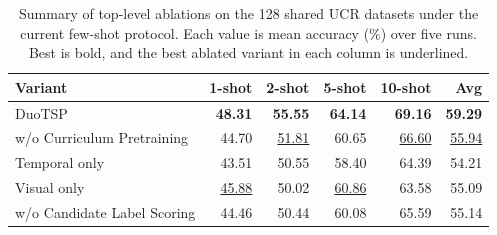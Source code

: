 \begin{table}[t]
\centering
\caption{Summary of top-level ablations on the 128 shared UCR datasets under the current few-shot protocol. Each value is mean accuracy (\%) over five runs. Best is bold, and the best ablated variant in each column is underlined.}
\label{tab:ablation-summary}
\begin{tabular}{lrrrrr}
\toprule
Variant & 1-shot & 2-shot & 5-shot & 10-shot & Avg \\
\midrule
DuoTSP & \textbf{48.31} & \textbf{55.55} & \textbf{64.14} & \textbf{69.16} & \textbf{59.29} \\
\midrule
w/o Curriculum Pretraining & 44.70 & \underline{51.81} & 60.65 & \underline{66.60} & \underline{55.94} \\
Temporal only & 43.51 & 50.55 & 58.40 & 64.39 & 54.21 \\
Visual only & \underline{45.88} & 50.02 & \underline{60.86} & 63.58 & 55.09 \\
w/o Candidate Label Scoring & 44.46 & 50.44 & 60.08 & 65.59 & 55.14 \\
\bottomrule
\end{tabular}
\end{table}
